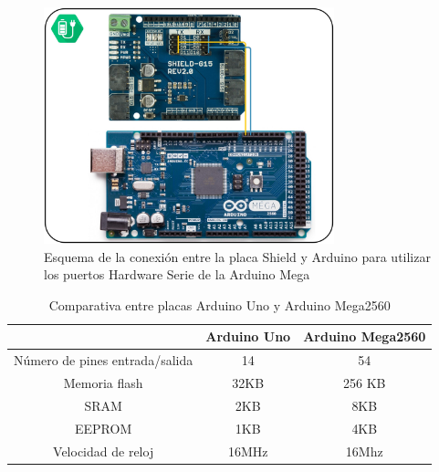     \begin{figure}[H]
    	\centering
    	\includegraphics[width=0.75\textwidth]{figuras/Imagenes_Electronica/Shield-Arduino-Conection.jpg}
    	\caption{Esquema de la conexión entre la placa Shield y Arduino para utilizar los puertos Hardware Serie de la Arduino Mega}
    	\label{fig:Electronica:shield-arduino}
    \end{figure}

    \begin{table}[H]
       	\caption{Comparativa entre placas Arduino Uno y Arduino Mega2560}
       	\label{tab:arduino_comparison}
       		\begin{center}
       			\begin{tabular}{ |c|c|c| }
       				\hline
       				&\textbf{Arduino Uno}&\textbf{Arduino Mega2560} \\
       				\hline
       				Número de pines entrada/salida & 14 & 54 \\
       				\hline
       				Memoria flash & 32KB & 256 KB \\
       				\hline
       				SRAM & 2KB & 8KB \\
       				\hline
       				EEPROM & 1KB & 4KB \\
       				\hline
       				Velocidad de reloj & 16MHz & 16Mhz \\
       				\hline
       			\end{tabular}
       		\end{center}
    \end{table}

